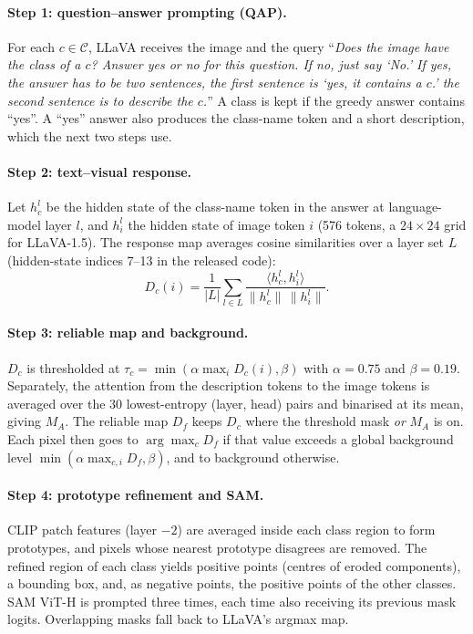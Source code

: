 \documentclass{article}
\begin{document}
\paragraph{Step 1: question--answer prompting (QAP).} For each $c\in\mathcal{C}$, LLaVA receives the
image and the query ``\emph{Does the image have the class of a $c$? Answer yes or no for this
question. If no, just say `No.' If yes, the answer has to be two sentences, the first sentence is
`yes, it contains a $c$.' the second sentence is to describe the $c$.}'' A class is kept if the
greedy answer contains ``yes''. A ``yes'' answer also produces the class-name token and a short
description, which the next two steps use.

\paragraph{Step 2: text--visual response.} Let $h^{l}_{c}$ be the hidden state of the class-name
token in the answer at language-model layer $l$, and $h^{l}_{i}$ the hidden state of image token $i$
(576 tokens, a $24\times24$ grid for LLaVA-1.5). The response map averages cosine similarities over a
layer set $L$ (hidden-state indices 7--13 in the released code):
\begin{equation}
  D_c(i)=\frac{1}{|L|}\sum_{l\in L}\frac{\langle h^l_c, h^l_i\rangle}{\lVert h^l_c\rVert\,\lVert h^l_i\rVert}.
  \label{eq:response}
\end{equation}

\paragraph{Step 3: reliable map and background.} $D_c$ is thresholded at
$\tau_c=\min(\alpha\max_i D_c(i),\beta)$ with $\alpha=0.75$ and $\beta=0.19$. Separately, the
attention from the description tokens to the image tokens is averaged over the 30 lowest-entropy
(layer, head) pairs and binarised at its mean, giving $M_A$. The reliable map $D_f$ keeps $D_c$ where
the threshold mask \emph{or} $M_A$ is on. Each pixel then goes to $\arg\max_c D_f$ if that value
exceeds a global background level $\min(\alpha\max_{c,i}D_f,\beta)$, and to background otherwise.

\paragraph{Step 4: prototype refinement and SAM.} CLIP patch features (layer $-2$) are averaged inside
each class region to form prototypes, and pixels whose nearest prototype disagrees are removed. The
refined region of each class yields positive points (centres of eroded components), a bounding box,
and, as negative points, the positive points of the other classes. SAM ViT-H is prompted three times,
each time also receiving its previous mask logits. Overlapping masks fall back to LLaVA's argmax map.
\end{document}
